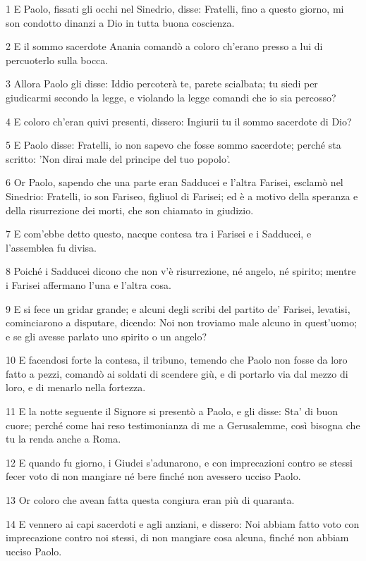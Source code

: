 \par 1 E Paolo, fissati gli occhi nel Sinedrio, disse: Fratelli, fino a questo giorno, mi son condotto dinanzi a Dio in tutta buona coscienza.
\par 2 E il sommo sacerdote Anania comandò a coloro ch'erano presso a lui di percuoterlo sulla bocca.
\par 3 Allora Paolo gli disse: Iddio percoterà te, parete scialbata; tu siedi per giudicarmi secondo la legge, e violando la legge comandi che io sia percosso?
\par 4 E coloro ch'eran quivi presenti, dissero: Ingiurii tu il sommo sacerdote di Dio?
\par 5 E Paolo disse: Fratelli, io non sapevo che fosse sommo sacerdote; perché sta scritto: 'Non dirai male del principe del tuo popolo'.
\par 6 Or Paolo, sapendo che una parte eran Sadducei e l'altra Farisei, esclamò nel Sinedrio: Fratelli, io son Fariseo, figliuol di Farisei; ed è a motivo della speranza e della risurrezione dei morti, che son chiamato in giudizio.
\par 7 E com'ebbe detto questo, nacque contesa tra i Farisei e i Sadducei, e l'assemblea fu divisa.
\par 8 Poiché i Sadducei dicono che non v'è risurrezione, né angelo, né spirito; mentre i Farisei affermano l'una e l'altra cosa.
\par 9 E si fece un gridar grande; e alcuni degli scribi del partito de' Farisei, levatisi, cominciarono a disputare, dicendo: Noi non troviamo male alcuno in quest'uomo; e se gli avesse parlato uno spirito o un angelo?
\par 10 E facendosi forte la contesa, il tribuno, temendo che Paolo non fosse da loro fatto a pezzi, comandò ai soldati di scendere giù, e di portarlo via dal mezzo di loro, e di menarlo nella fortezza.
\par 11 E la notte seguente il Signore si presentò a Paolo, e gli disse: Sta' di buon cuore; perché come hai reso testimonianza di me a Gerusalemme, così bisogna che tu la renda anche a Roma.
\par 12 E quando fu giorno, i Giudei s'adunarono, e con imprecazioni contro se stessi fecer voto di non mangiare né bere finché non avessero ucciso Paolo.
\par 13 Or coloro che avean fatta questa congiura eran più di quaranta.
\par 14 E vennero ai capi sacerdoti e agli anziani, e dissero: Noi abbiam fatto voto con imprecazione contro noi stessi, di non mangiare cosa alcuna, finché non abbiam ucciso Paolo.
